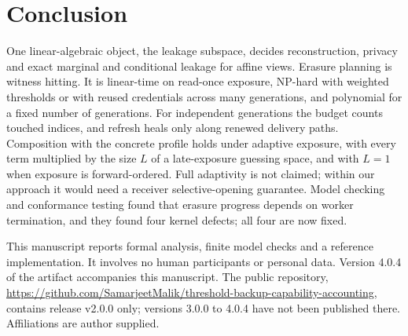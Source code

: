 \documentclass[pdflatex,sn-mathphys-num]{sn-jnl}
\theoremstyle{plain}
\theoremstyle{definition}
\begin{document}
\section{Conclusion}
One linear-algebraic object, the leakage subspace, decides reconstruction, privacy and exact marginal and conditional leakage for affine views. Erasure planning is witness hitting. It is linear-time on read-once exposure, NP-hard with weighted thresholds or with reused credentials across many generations, and polynomial for a fixed number of generations. For independent generations the budget counts touched indices, and refresh heals only along renewed delivery paths. Composition with the concrete profile holds under adaptive exposure, with every term multiplied by the size $L$ of a late-exposure guessing space, and with $L=1$ when exposure is forward-ordered. Full adaptivity is not claimed; within our approach it would need a receiver selective-opening guarantee. Model checking and conformance testing found that erasure progress depends on worker termination, and they found four kernel defects; all four are now fixed.


\backmatter
{}
This manuscript reports formal analysis, finite model checks and a reference implementation. It involves no human participants or personal data. Version 4.0.4 of the artifact accompanies this manuscript. The public repository, \url{https://github.com/SamarjeetMalik/threshold-backup-capability-accounting}, contains release v2.0.0 only; versions 3.0.0 to 4.0.4 have not been published there. Affiliations are author supplied.
\end{document}
